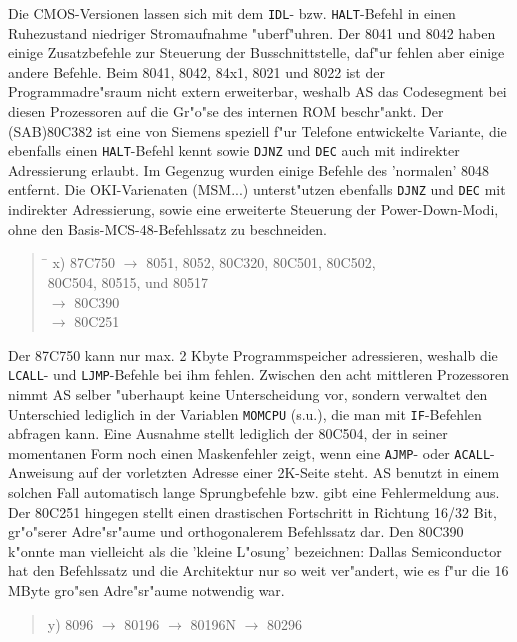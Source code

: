 \documentclass[12pt,a4paper,twoside]{report}
\newcommand{\tty}[1]{{\tt #1}}
\begin{document}
Die CMOS-Versionen lassen
sich mit dem \tty{IDL}- bzw. \tty{HALT}-Befehl in einen Ruhezustand niedriger
Stromaufnahme "uberf"uhren.  Der 8041 und 8042 haben einige Zusatzbefehle zur
Steuerung der Busschnittstelle, daf"ur fehlen aber einige andere Befehle.
Beim 8041, 8042, 84x1, 8021 und 8022 ist der Programmadre"sraum nicht
extern erweiterbar, weshalb AS das Codesegment bei diesen Prozessoren
auf die Gr"o"se des internen ROM beschr"ankt.  Der (SAB)80C382 ist eine von
Siemens speziell f"ur Telefone entwickelte Variante, die ebenfalls
einen \tty{HALT}-Befehl kennt sowie \tty{DJNZ} und \tty{DEC} auch
mit indirekter Adressierung erlaubt.  Im Gegenzug wurden einige
Befehle des 'normalen' 8048 entfernt. Die OKI-Varienaten (MSM...)
unterst"utzen ebenfalls \tty{DJNZ} und \tty{DEC} mit indirekter
Adressierung, sowie eine erweiterte Steuerung der
Power-Down-Modi, ohne den Basis-MCS-48-Befehlssatz zu
beschneiden.
\begin{quote}
\begin{tabbing}
\hspace{0.7cm} \= \kill
x) \> 87C750 $\rightarrow$ 8051, 8052, 80C320, 80C501, 80C502, \\
   \> 80C504, 80515, und 80517 \\
   \> $\rightarrow$ 80C390 \\
   \> $\rightarrow$ 80C251
\end{tabbing}
\end{quote}
Der 87C750 kann nur max. 2 Kbyte Programmspeicher adressieren, weshalb
die \tty{LCALL}- und \tty{LJMP}-Befehle bei ihm fehlen.  Zwischen den
acht mittleren Prozessoren nimmt AS selber "uberhaupt keine Unterscheidung
vor, sondern verwaltet den Unterschied lediglich in der Variablen
\tty{MOMCPU} (s.u.), die man mit \tty{IF}-Befehlen abfragen kann.  Eine
Ausnahme stellt lediglich der 80C504, der in seiner momentanen Form noch einen
Maskenfehler zeigt, wenn eine \tty{AJMP}- oder \tty{ACALL}-Anweisung auf der
vorletzten Adresse einer 2K-Seite steht.  AS benutzt in einem solchen
Fall automatisch lange Sprungbefehle bzw. gibt eine Fehlermeldung aus.  Der
80C251 hingegen stellt einen drastischen Fortschritt in Richtung 16/32 Bit,
gr"o"serer Adre"sr"aume und orthogonalerem Befehlssatz dar.  Den 80C390
k"onnte man vielleicht als die 'kleine L"osung' bezeichnen:  Dallas
Semiconductor hat den Befehlssatz und die Architektur nur so weit
ver"andert, wie es f"ur die 16 MByte gro"sen Adre"sr"aume notwendig war.
\begin{quote}
y) 8096 $\rightarrow$ 80196 $\rightarrow$ 80196N $\rightarrow$ 80296
\end{quote}
\end{document}
